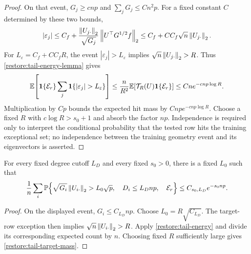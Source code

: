 \begin{proof}
On that event, $G_j\ge c{np}$ and $\sum_jG_j\le C{n^2p}$.
For a fixed constant $C$ determined by these two bounds,
\[
 |\varepsilon_j|
 \le C_f+\frac{\left\lVert U_{j\cdot}\right\rVert_2}{\sqrt{G_j}}
                  \left\lVert U^\top G^{1/2}f\right\rVert_2
 \le C_f+CC_f\sqrt n\left\lVert U_{j\cdot}\right\rVert_2.
\]
For $L_\varepsilon=C_f+CC_fR$, the event
$|\varepsilon_j|>L_\varepsilon$ implies $\sqrt n\left\lVert U_{j\cdot}\right\rVert_2>R$.
Thus \cref{restore:tail-energy-lemma} gives
\begin{equation}
 \E\!\left[\ind{\mathcal E_r}
                    \sum_j\ind{|\varepsilon_j|>L_\varepsilon}\right]
 \le\frac n{R^2}\E[\mathcal T_R(U)\ind{\mathcal E_r}]
 \le Cne^{-c{np}\log R}.
 \label{restore:tail-coefficient-count}
\end{equation}
Multiplication by $Cp$ bounds the expected hit mass by
$C{np} e^{-c{np}\log R}$.
Choose a fixed $R$ with $c\log R>s_0+1$ and absorb the factor ${np}$.
Independence is required only to interpret the conditional probability
that the tested row hits the training exceptional set; no independence
between the training geometry event and its eigenvectors is asserted.
\end{proof}

\begin{corollary}
\label{restore:tail-target-corollary}
For every fixed degree cutoff $L_D$ and every fixed $s_0>0$, there is
a fixed $L_0$ such that
\begin{equation}
 \frac1n\sum_i\mathbb P\!\left\{
    \sqrt{G_i}\left\lVert U_{i\cdot}\right\rVert_2>L_0\sqrt{p},\quad
    D_i\le L_D{np},\quad \mathcal E_r\right\}
 \le C_{s_0,L_D}e^{-s_0{np}}.
 \label{restore:tail-target-mass}
\end{equation}
\end{corollary}

\begin{proof}
On the displayed event, $G_i\le C_{L_D}{np}$.
Choose $L_0=R\sqrt{C_{L_D}}$.
The target-row exception then implies
$\sqrt n\left\lVert U_{i\cdot}\right\rVert_2>R$.
Apply \eqref{restore:tail-energy} and divide its corresponding
expected count by $n$.  Choosing fixed $R$ sufficiently large gives
\eqref{restore:tail-target-mass}.
\end{proof}

